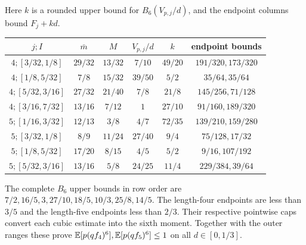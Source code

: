 Here $k$ is a rounded upper bound for $B_6(V_{p,j}/d)$, and the endpoint
columns bound $F_j+kd$.
\begin{center}\small
\begin{tabular}{@{}cccccc@{}}\toprule
$j;I$&$\bar m$&$M$&$V_{p,j}/d$&$k$&endpoint bounds\\\midrule
$4;[3/32,1/8]$&$29/32$&$13/32$&$7/10$&$49/20$&$191/320,173/320$\\
$4;[1/8,5/32]$&$7/8$&$15/32$&$39/50$&$5/2$&$35/64,35/64$\\
$4;[5/32,3/16]$&$27/32$&$21/40$&$7/8$&$21/8$&$145/256,71/128$\\
$4;[3/16,7/32]$&$13/16$&$7/12$&$1$&$27/10$&$91/160,189/320$\\
$5;[1/16,3/32]$&$12/13$&$3/8$&$4/7$&$72/35$&$139/210,159/280$\\
$5;[3/32,1/8]$&$8/9$&$11/24$&$27/40$&$9/4$&$75/128,17/32$\\
$5;[1/8,5/32]$&$17/20$&$8/15$&$4/5$&$5/2$&$9/16,107/192$\\
$5;[5/32,3/16]$&$13/16$&$5/8$&$24/25$&$11/4$&$229/384,39/64$\\\bottomrule
\end{tabular}
\end{center}
The complete $B_6$ upper bounds in row order are
$7/2,16/5,3,27/10,18/5,10/3,25/8,14/5$.
The length-four endpoints are less than $3/5$ and the length-five endpoints
less than $2/3$. Their respective pointwise caps convert each cubic
estimate into the sixth moment. Together with the outer ranges these
prove $\mathbb E[p(qf_4)^6],\mathbb E[p(qf_5)^6]\le1$ on all $d\in[0,1/3]$.
